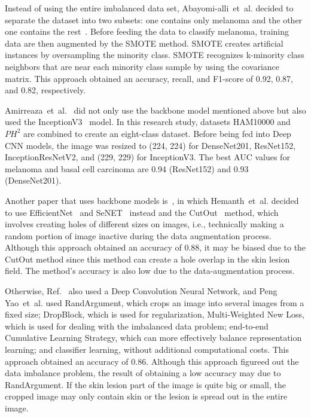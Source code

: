 \documentclass[sensors,article,accept,pdftex,moreauthors]{Definitions/mdpi}
\begin{document}
{		Instead of using the entire imbalanced data set, Abayomi-alli~et~al. decided to separate the dataset into two subsets: one contains only melanoma and the other one contains the rest~\mbox{\cite{2101.133}}. Before feeding the data to classify  melanoma, training data are then augmented by the SMOTE method. SMOTE creates artificial instances by oversampling the minority class. SMOTE recognizes k-minority class neighbors that are near  each minority class sample by using the covariance matrix. This approach obtained an accuracy, recall, and F1-score of 0.92, 0.87, and 0.82, respectively.
		
		Amirreaza~et~al.~\mbox{\cite{10348}} did not only use the backbone model mentioned above but also used the InceptionV3~\mbox{\cite{00567}} model. In this research study,  datasets HAM10000 and $PH^2$ are combined to create an eight-class dataset. Before being fed into  Deep CNN models, the image was resized to (224, 224) for DenseNet201, ResNet152, InceptionResNetV2, and (229, 229) for InceptionV3. The best AUC values for melanoma and basal cell carcinoma are 0.94 (ResNet152) and 0.93 (DenseNet201).
		
		Another paper that uses  backbone models is~\mbox{\cite{09418}},  in which Hemanth~et~al. decided to use EfficientNet~\mbox{\cite{11946}} and SeNET~\mbox{\cite{01507}} instead and the CutOut~\mbox{\cite{04552v2}} method, which involves creating holes of different sizes on  images, i.e., technically making a random portion of image inactive during the data augmentation process. Although this approach obtained an accuracy of 0.88, it may be biased due to the CutOut method since this method can create a hole overlap in the skin lesion field. The method's accuracy is also low due to the data-augmentation process. 
		
		Otherwise, Ref.~\mbox{\cite{01284}} also used a Deep Convolution Neural Network, and Peng Yao~et~al. used RandArgument, which crops an image into several images from a fixed size; DropBlock, which is used for regularization, Multi-Weighted New Loss, which is used for dealing with the imbalanced data problem; end-to-end Cumulative Learning Strategy, which can more effectively balance representation learning; and classifier learning, without additional computational costs. This approach obtained an accuracy of 0.86. Although this approach figureed out the data imbalance problem, the result of obtaining a low accuracy may due to  RandArgument. If the skin lesion part of the image is quite big or  small, the cropped image may only contain  skin or the lesion is spread out in the entire image.
		
}
\end{document}
